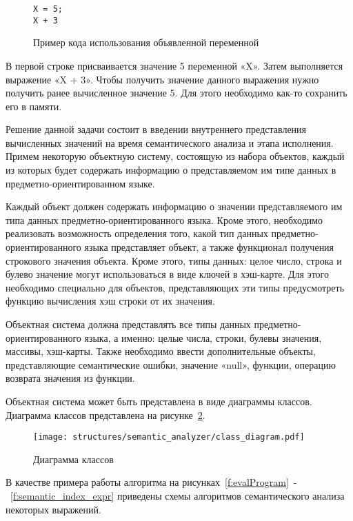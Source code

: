 \begin{figure}[ht]
	\centering
	\vspace{\toppaddingoffigure}
	\begin{lstlisting}
X = 5;
X + 3
\end{lstlisting}
	\caption{Пример кода использования объявленной переменной}
	\label{f:code_example_var}
\end{figure}

В первой строке присваивается значение 5 переменной «X».
Затем выполняется выражение «X + 3».
Чтобы получить значение данного выражения нужно получить ранее вычисленное значение 5.
Для этого необходимо как-то сохранить его в памяти.

Решение данной задачи состоит в введении внутреннего представления вычисленных значений на время семантического анализа и этапа исполнения.
Примем некоторую объектную систему, состоящую из набора объектов, каждый из которых будет содержать информацию о представляемом им типе данных в предметно-ориентированном языке.

Каждый объект должен содержать информацию о значении представляемого им типа данных предметно-ориентированного языка.
Кроме этого, необходимо реализовать возможность определения того, какой тип данных предметно-ориентированного языка представляет объект, а также функционал получения строкового значения объекта.
Кроме этого, типы данных: целое число, строка и булево значение могут использоваться в виде ключей в хэш-карте.
Для этого необходимо специально для объектов, представляющих эти типы предусмотреть функцию вычисления хэш строки от их значения. 

Объектная система должна представлять все типы данных предметно-ориентированного языка, а именно:
целые числа, строки, булевы значения, массивы, хэш-карты.
Также необходимо ввести дополнительные объекты, представляющие семантические ошибки, значение «null», функции, операцию возврата значения из функции.

Объектная система может быть представлена в виде диаграммы классов.
Диаграмма классов представлена на рисунке~\ref{f:class_diagram}.

\clearpage

\begin{figure}[!htp]
	\centering
	\texttt{[image: structures/semantic\_analyzer/class\_diagram.pdf]}
	\caption{Диаграмма классов}
	\label{f:class_diagram}
\end{figure}

В качестве примера работы алгоритма на рисунках~\ref{f:evalProgram}~-~\ref{f:semantic_index_expr} приведены схемы алгоритмов семантического анализа некоторых выражений.

